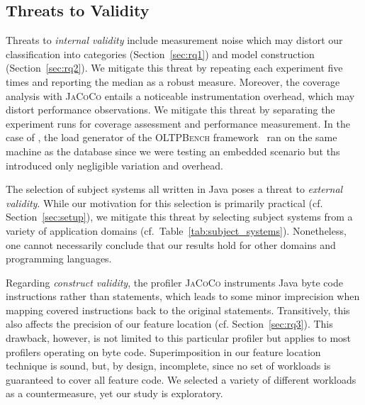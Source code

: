 \subsection{Threats to Validity}\label{sec:threats}
Threats to \emph{internal validity} include measurement noise which may distort our classification into categories (Section~\ref{sec:rq1}) and model construction (Section~\ref{sec:rq2}). We mitigate this threat by repeating each experiment five times and reporting the median as a robust measure. %
Moreover, the coverage analysis with \mbox{\textsc{JaCoCo}} entails a noticeable instrumentation overhead, which may distort performance observations. We mitigate this threat by separating the experiment runs for coverage assessment and performance measurement. In the case of \htwo, the load generator of the \textsc{OLTPBench} framework~\cite{difallah_oltp_2013} ran on the same machine as the database since we were testing an embedded scenario but ths introduced only negligible variation and overhead.

The selection of subject systems all written in Java poses a threat to \emph{external validity}. While our motivation for this selection is primarily practical (cf. Section~\ref{sec:setup}), we mitigate this threat by selecting subject systems from a variety of application domains (cf.~Table~\ref{tab:subject_systems}). Nonetheless, one cannot necessarily conclude that our results hold for other domains and programming languages. 

Regarding \emph{construct validity}, the profiler \textsc{JaCoCo} instruments Java byte code instructions rather than statements, which leads to some minor imprecision when mapping covered instructions back to the original statements. 
{\color{orange}
Transitively, this also affects the precision of our feature location (cf. Section~\ref{sec:rq3}). This drawback, however, is not limited to this particular profiler but applies to most profilers operating on byte code. 
Superimposition in our feature location technique is sound, but, by design, incomplete, since no set of workloads is guaranteed to cover all feature code. We selected a variety of different workloads as a countermeasure, yet our study is exploratory.
} 

